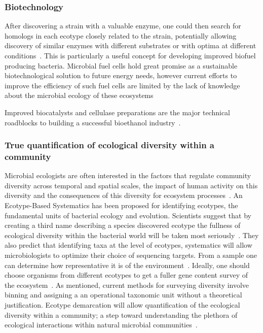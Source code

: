 \subsubsection*{Biotechnology}
After discovering a strain with a valuable enzyme, one could then search for homologs in each ecotype closely related to the strain, potentially allowing discovery of similar enzymes with different substrates or with optima at different conditions~\cite{cohan2007systematics}.
This is particularly a useful concept for developing improved biofuel producing bacteria.
Microbial fuel cells hold great promise as a sustainable biotechnological solution to future energy needs, however current efforts to improve the efficiency of such fuel cells are limited by the lack of knowledge about the microbial ecology of these ecosystems~\cite{rabaey2004biofuel}

Improved biocatalysts and cellulase preparations are the major technical roadblocks to building a successful bioethanol industry~\cite{dien2003bacteria}.

\subsubsection*{True quantification of ecological diversity within a community}
Microbial ecologists are often interested in the factors that regulate community diversity across temporal and spatial scales, the impact of human activity on this diversity and the consequences of this diversity for ecosystem processes~\cite{bohannan2003new}.
An Ecotype-Based Systematics has been proposed for identifying ecotypes, the fundamental units of bacterial ecology and evolution.
Scientists suggest that by creating a third name describing a species discovered ecotype the fullness of ecological diversity within the bacterial world will be taken most seriously~\cite{cohan2007systematics}.
They also predict that identifying taxa at the level of ecotypes, systematics will allow microbiologists to optimize their choice of sequencing targets.
From a sample one can determine how representative it is of the environment~\cite{bohannan2003new}.
Ideally, one should choose organisms from different ecotypes to get a fuller gene content survey of the ecosystem~\cite{cohan2007systematics}.
As mentioned, current methods for surveying diversity involve binning and assigning a an operational taxonomic unit without a theoretical justification.
Ecotype demarcation will allow quantification of the ecological diversity within a community; a step toward understanding the plethora of ecological interactions within natural microbial communities~\cite{cohan2007systematics}.

